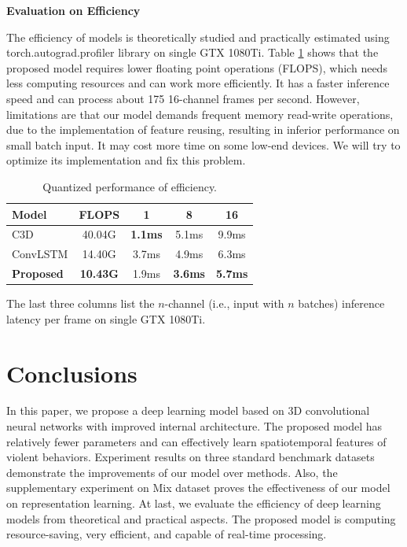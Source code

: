 \documentclass[10pt,twocolumn,letterpaper]{article}
\begin{document}
\noindent\textbf{Evaluation on Efficiency}

The efficiency of models is theoretically studied and practically estimated using torch.autograd.profiler library on single GTX 1080Ti.
Table \ref{table:efficiency} shows that the proposed model requires lower floating point operations (FLOPS), which needs less computing resources and can work more efficiently.
It has a faster inference speed and can process about 175 16-channel frames per second.
However, limitations are that our model demands frequent memory read-write operations, due to the implementation of feature reusing, resulting in inferior performance on small batch input.
It may cost more time on some low-end devices.
We will try to optimize its implementation and fix this problem.


\begin{table}
\begin{center}
\caption{Quantized performance of efficiency.}
\label{table:efficiency}
\begin{tabular}{lcccc}
\hline
\textbf{Model} & \textbf{FLOPS} & \textbf{1} & \textbf{8} & \textbf{16}\\
\hline\hline
C3D \cite{3dcnn_1} & 40.04G & \textbf{1.1ms} & 5.1ms & 9.9ms \\
ConvLSTM \cite{convlstm_sudh} & 14.40G & 3.7ms & 4.9ms & 6.3ms \\
\textbf{Proposed} & \textbf{10.43G} & 1.9ms & \textbf{3.6ms} & \textbf{5.7ms} \\
\hline
\end{tabular}
\end{center}
\footnotesize
The last three columns list the $n$-channel (i.e., input with $n$ batches) inference latency per frame on single GTX 1080Ti.
\end{table}


\section{Conclusions}
\label{sec:5}

In this paper, we propose a deep learning model based on 3D convolutional neural networks with improved internal architecture. 
The proposed model has relatively fewer parameters and can effectively learn spatiotemporal features of violent behaviors. 
Experiment results on three standard benchmark datasets demonstrate the improvements of our model over methods. 
Also, the supplementary experiment on Mix dataset proves the effectiveness of our model on representation learning. 
At last, we evaluate the efficiency of deep learning models from theoretical and practical aspects.
The proposed model is computing resource-saving, very efficient, and capable of real-time processing. 
\end{document}
